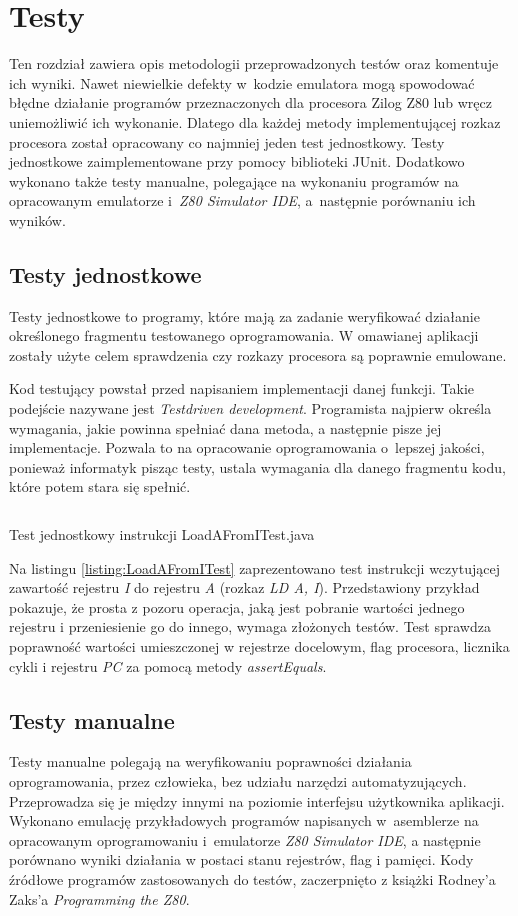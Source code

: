 \chapter{Testy}
	Ten rozdział zawiera opis metodologii przeprowadzonych testów oraz komentuje ich wyniki. Nawet niewielkie defekty w~kodzie emulatora mogą spowodować błędne działanie programów przeznaczonych dla procesora Zilog Z80 lub wręcz uniemożliwić ich wykonanie. Dlatego dla każdej metody implementującej rozkaz procesora został opracowany co najmniej jeden test jednostkowy. Testy jednostkowe zaimplementowane przy pomocy biblioteki JUnit. Dodatkowo wykonano także testy manualne, polegające na wykonaniu programów na opracowanym emulatorze i~\emph{Z80 Simulator IDE}, a~następnie porównaniu ich wyników.
	
	\section{Testy jednostkowe}
	Testy jednostkowe to programy, które mają za zadanie weryfikować działanie określonego fragmentu testowanego oprogramowania. W omawianej aplikacji zostały użyte celem sprawdzenia czy rozkazy procesora są poprawnie emulowane.
	
	Kod testujący powstał przed napisaniem implementacji danej funkcji. Takie podejście nazywane jest \emph{Test{\dywiz}driven development}. Programista najpierw określa wymagania, jakie powinna spełniać dana metoda, a następnie pisze jej implementacje. Pozwala to na opracowanie oprogramowania o~lepszej jakości, ponieważ informatyk pisząc testy, ustala wymagania dla danego fragmentu kodu, które potem stara się spełnić\cite{tdd}.
	
	\begin{listing}[H]
		\inputminted{Java}{listings/exampleTest.java}
		\caption{Test jednostkowy instrukcji LoadAFromITest.java}
		\label{listing:LoadAFromITest}
	\end{listing}
	
	Na listingu \ref{listing:LoadAFromITest} zaprezentowano test instrukcji wczytującej zawartość rejestru \emph{I} do rejestru \emph{A} (rozkaz \emph{LD A, I}). Przedstawiony przykład pokazuje, że prosta z pozoru operacja, jaką jest pobranie wartości jednego rejestru i przeniesienie go do innego, wymaga złożonych testów.	Test sprawdza poprawność wartości umieszczonej w rejestrze docelowym, flag procesora, licznika cykli i rejestru \emph{PC} za pomocą metody \emph{assertEquals}.
	
	\section{Testy manualne}
	Testy manualne polegają na weryfikowaniu poprawności działania oprogramowania, przez człowieka, bez udziału narzędzi automatyzujących. Przeprowadza się je między innymi na poziomie interfejsu użytkownika aplikacji. Wykonano emulację przykładowych programów napisanych w~asemblerze na opracowanym oprogramowaniu i~emulatorze \emph{Z80 Simulator IDE}, a następnie porównano wyniki działania w postaci stanu rejestrów, flag i pamięci. Kody źródłowe programów zastosowanych do testów, zaczerpnięto z książki Rodney'a Zaks'a \emph{Programming the Z80}\cite{programming_the_z80}.
	
